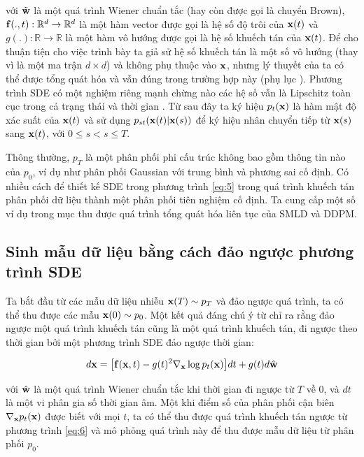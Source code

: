 \documentclass{article} %
\begin{document}
với $\tilde{\bold{w}}$ là một quá trình Wiener chuẩn tắc (hay còn được gọi là chuyển Brown), $\bold{f}(.,t): \mathbb{R}^d \rightarrow \mathbb{R}^d$ là một hàm vector được gọi là hệ số độ trôi của $\bold{x}(t)$ và $g(.): \mathbb{R} \rightarrow \mathbb{R}$ là một hàm vô hướng được gọi là hệ số khuếch tán của $\bold{x}(t)$.
Để cho thuận tiện cho việc trình bày ta giả sử hệ số khuếch tán là một số vô hướng (thay vì là một ma trận $d \times d$) và không phụ thuộc vào $\bold{x}$, nhưng lý thuyết của ta có thể được tổng quát hóa và vẫn đúng trong trường hợp này (phụ lục ).
Phương trình SDE có một nghiệm riêng mạnh chừng nào các hệ số vẫn là Lipschitz toàn cục trong cả trạng thái và thời gian \citep{oksendal2003stochastic}.
Từ sau đây ta ký hiệu $p_t (\bold{x})$ là hàm mật độ xác suất của $\bold{x}(t)$ và sử dụng $p_{st}(\bold{x}(t) \vert \bold{x}(s))$ để ký hiệu nhân chuyển tiếp từ $\bold{x}(s)$ sang $\bold{x}(t)$, với $0 \leq s < s \leq T$.

Thông thường, $p_T$ là một phân phối phi cấu trúc không bao gồm thông tin nào của $p_0$, ví dụ như phân phối Gaussian với trung bình và phương sai cố định.
Có nhiều cách để thiết kế SDE trong phương trình \ref{eq:5} trong quá trình khuếch tán phân phối dữ liệu thành một phân phối tiên nghiệm cố định.
Ta cung cấp một số ví dụ trong mục  thu được quá trình tổng quát hóa liên tục của SMLD và DDPM.

\subsection{Sinh mẫu dữ liệu bằng cách đảo ngược phương trình SDE}

Ta bắt đầu từ các mẫu dữ liệu nhiễu $\bold{x}(T) \sim p_T$ và đảo ngược quá trình, ta có thể thu được các mẫu $\bold{x}(0) \sim p_0$.
Một kết quả đáng chú ý từ \citep{anderson1982reverse} chỉ ra rằng đảo ngược một quá trình khuếch tán cũng là một quá trình khuếch tán, đi ngược theo thời gian bởi một phương trình SDE đảo ngược thời gian:

\begin{equation} \label{eq:6}
    d \bold{x} = \big \lbrack \bold{f}(\bold{x}, t) - g(t)^2 \nabla_{\bold{x}} \log p_t (\bold{x}) \big \rbrack dt + g(t) d \hat{\bold{w}}
\end{equation}

với $\hat{\bold{w}}$ là một quá trình Wiener chuẩn tắc khi thời gian đi ngược từ $T$ về $0$, và $dt$ là một vi phân gia số thời gian âm.
Một khi điểm số của phân phối cận biên $\nabla_{\bold{x}} p_t(\bold{x})$ được biết với mọi $t$, ta có thể thu được quá trình khuếch tán ngược từ phương trình \ref{eq:6} và mô phỏng quá trình này để thu được mẫu dữ liệu từ phân phối $p_0$.
\end{document}
